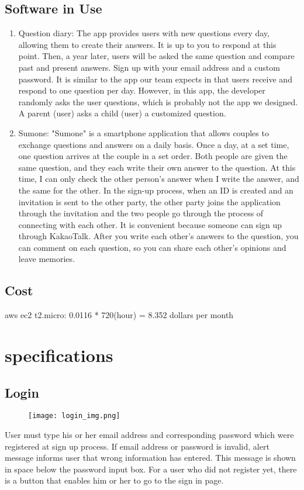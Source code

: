 \documentclass[conference]{IEEEtran}
\begin{document}
\subsection{Software in Use}
    \begin{enumerate}
        \item Question diary:
        The app provides users with new questions every day, allowing them to create their answers. It is up to you to respond at this point. Then, a year later, users will be asked the same question and compare past and present answers. Sign up with your email address and a custom password. It is similar to the app our team expects in that users receive and respond to one question per day. However, in this app, the developer randomly asks the user questions, which is probably not the app we designed. A parent (user) asks a child (user) a customized question.
        \item Sumone:
        "Sumone" is a smartphone application that allows couples to exchange questions and answers on a daily basis. Once a day, at a set time, one question arrives at the couple in a set order. Both people are given the same question, and they each write their own answer to the question. At this time, I can only check the other person's answer when I write the answer, and the same for the other. In the sign-up process, when an ID is created and an invitation is sent to the other party, the other party joins the application through the invitation and the two people go through the process of connecting with each other. It is convenient because someone can sign up through KakaoTalk. After you write each other's answers to the question, you can comment on each question, so you can share each other's opinions and leave memories.
    \end{enumerate}
\subsection{Cost}
aws ec2 t2.micro: 0.0116 * 720(hour) = 8.352 dollars per month

\section{specifications}

\subsection{Login}
\begin{figure}[H]
    \centering
    \texttt{[image: login\_img.png]}
    \end{figure}
    User must type his or her email address and corresponding password which were registered at sign up process. If email address or password is invalid, alert message informs user that wrong information has entered. This message is shown in space below the password input box. For a user who did not register yet, there is a button that enables him or her to go to the sign in page.
    
\end{document}
